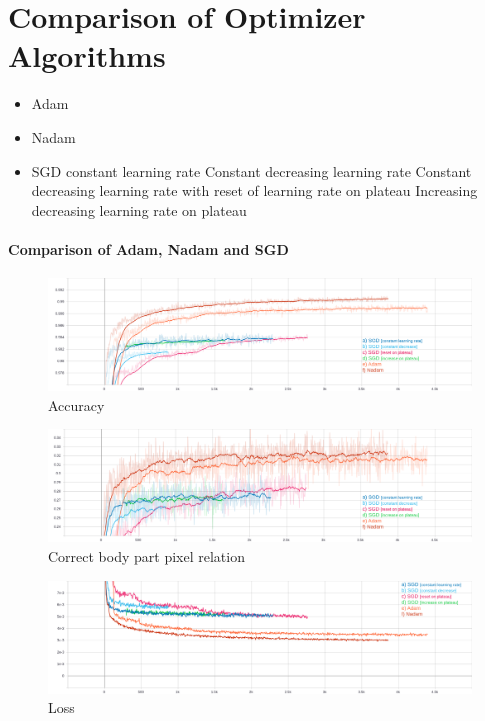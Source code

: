 \section{Comparison of Optimizer Algorithms}

\begin{itemize}
    \item Adam
    \item Nadam
    \item SGD
    \subitem constant learning rate
    \subitem Constant decreasing learning rate
    \subitem Constant decreasing learning rate with reset of learning rate on plateau
    \subitem Increasing decreasing learning rate on plateau
\end{itemize}

\paragraph{Comparison of Adam, Nadam and SGD}
\begin{figure}[H]
    \centering
    \includegraphics[width=\textwidth,height=\textheight,keepaspectratio]{img/accuracy_all.png}
    \decoRule
    \caption[Accuracy]{Accuracy}
    \label{fig:accuracy}
\end{figure}
\begin{figure}[H]
    \centering
    \includegraphics[width=\textwidth,height=\textheight,keepaspectratio]{img/accuracy_body_part_all.png}
    \decoRule
    \caption[Correct BPR]{Correct body part pixel relation}
    \label{fig:acc-bp}
\end{figure}
\begin{figure}[H]
    \centering
    \includegraphics[width=\textwidth,height=\textheight,keepaspectratio]{img/loss_all.png}
    \decoRule
    \caption[loss]{Loss}
    \label{fig:loss}
\end{figure}

